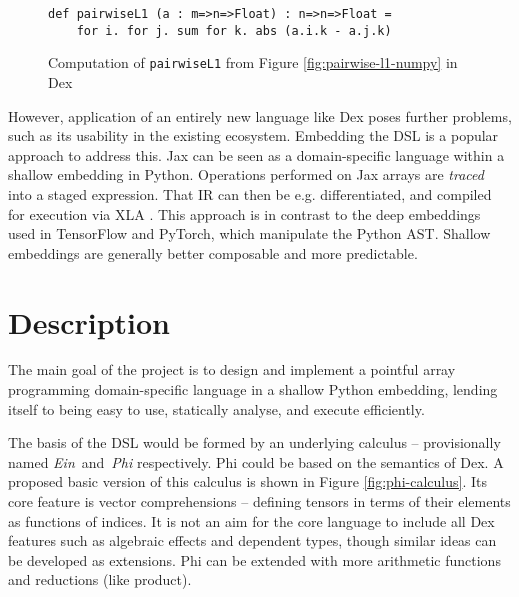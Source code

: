 \begin{figure}[h]
    \centering
    \begin{minipage}{0.6\textwidth}        
    \begin{verbatim}
def pairwiseL1 (a : m=>n=>Float) : n=>n=>Float =
    for i. for j. sum for k. abs (a.i.k - a.j.k) 
    \end{verbatim}
    \end{minipage}
    \caption{Computation of \texttt{pairwiseL1} from Figure \ref{fig:pairwise-l1-numpy} in Dex}
    \label{fig:pairwise-l1-dex}
\end{figure}

However, application of an entirely new language like Dex poses further problems, such as its usability in the existing ecosystem. Embedding the DSL \cite{10.1145/2692915.2628138} is a popular approach to address this. Jax \cite{jax2018} can be seen as a domain-specific language within a shallow embedding in Python. Operations performed on Jax arrays are \textit{traced} into a staged expression. That IR can then be e.g. differentiated, and compiled for execution via XLA \cite{jax2018github}. This approach is in contrast to the deep embeddings used in TensorFlow and PyTorch, which manipulate the Python AST. Shallow embeddings are generally better composable and more predictable.

\section{Description}

The main goal of the project is to design and implement a pointful array programming domain-specific language in a shallow Python embedding, lending itself to being easy to use, statically analyse, and execute efficiently.

The basis of the DSL would be formed by an underlying calculus -- provisionally named \textit{Ein}~and~\textit{Phi} respectively. Phi could be based on the semantics of Dex. A proposed basic version of this calculus is shown in Figure \ref{fig:phi-calculus}. Its core feature is vector comprehensions -- defining tensors in terms of their elements as functions of indices. It is not an aim for the core language to include all Dex features such as algebraic effects and dependent types, though similar ideas can be developed as extensions. Phi can be extended with more arithmetic functions and reductions (like product).

